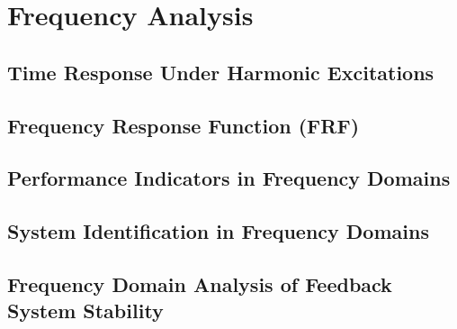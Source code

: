\documentclass[12pt,letter]{article}
\begin{document}
	
%	

	\setcounter{section}{7}	
	\setcounter{figure}{\thesection}   
	\renewcommand\thefigure{\thesection.\arabic{figure}}
	\setcounter{equation}{\thesection}   
	\renewcommand\theequation{\thesection.\arabic{equation}}

\section{Frequency Analysis}

\subsection{Time Response Under Harmonic Excitations}



\subsection{Frequency Response Function (FRF)}



\subsection{Performance Indicators in Frequency Domains}


\subsection{System Identification in Frequency Domains}


\subsection{Frequency Domain Analysis of Feedback System Stability}

\end{document}
